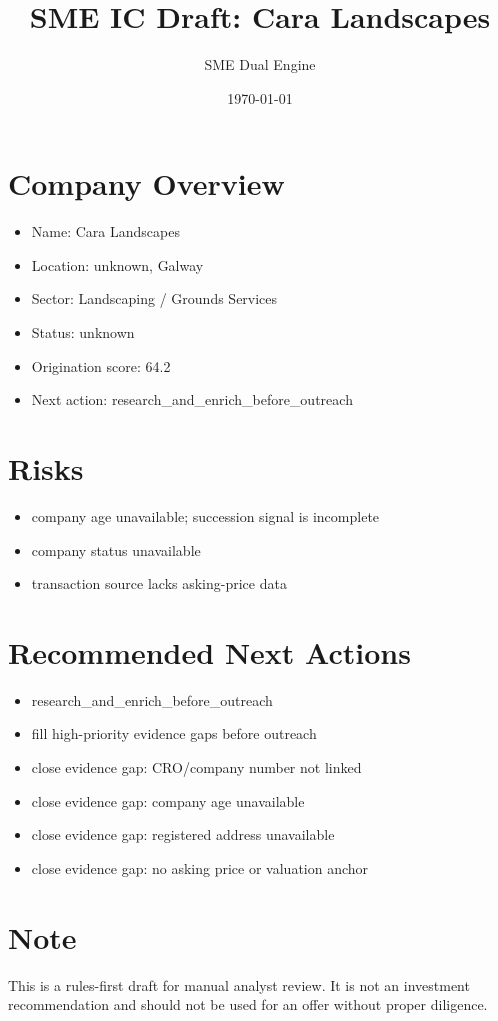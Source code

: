 \documentclass[11pt,a4paper]{article}
\title{SME IC Draft: Cara Landscapes}
\author{SME Dual Engine}
\date{\today}
\begin{document}
\maketitle
\section*{Company Overview}
\begin{itemize}[leftmargin=1.4em]
\item Name: Cara Landscapes
\item Location: unknown, Galway
\item Sector: Landscaping / Grounds Services
\item Status: unknown
\item Origination score: 64.2
\item Next action: research\_and\_enrich\_before\_outreach
\end{itemize}
\section*{Risks}
\begin{itemize}[leftmargin=1.4em]
\item company age unavailable; succession signal is incomplete
\item company status unavailable
\item transaction source lacks asking-price data
\end{itemize}
\section*{Recommended Next Actions}
\begin{itemize}[leftmargin=1.4em]
\item research\_and\_enrich\_before\_outreach
\item fill high-priority evidence gaps before outreach
\item close evidence gap: CRO/company number not linked
\item close evidence gap: company age unavailable
\item close evidence gap: registered address unavailable
\item close evidence gap: no asking price or valuation anchor
\end{itemize}
\section*{Note}
This is a rules-first draft for manual analyst review. It is not an investment
recommendation and should not be used for an offer without proper diligence.
\end{document}
